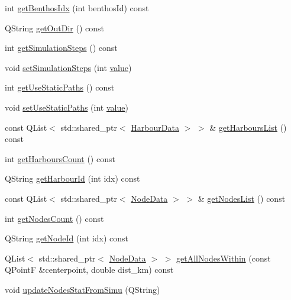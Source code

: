 \begin{DoxyCompactItemize}
\item 
int \mbox{\hyperlink{class_displace_model_a554fafffbd11c2f6a3d6f5bbebbc7d39}{get\+Benthos\+Idx}} (int benthos\+Id) const
\item 
Q\+String \mbox{\hyperlink{class_displace_model_a82e56722ade1c90788c7f2ab629f7ec3}{get\+Out\+Dir}} () const
\item 
int \mbox{\hyperlink{class_displace_model_a84b594669bad027277c2d37d089922b2}{get\+Simulation\+Steps}} () const
\item 
void \mbox{\hyperlink{class_displace_model_a37ba1a54fada6de2335be2c94f98ece3}{set\+Simulation\+Steps}} (int \mbox{\hyperlink{diffusion_8cpp_a4b41795815d9f3d03abfc739e666d5da}{value}})
\item 
int \mbox{\hyperlink{class_displace_model_ab04195fc2d35729735bf0c7c4572ca57}{get\+Use\+Static\+Paths}} () const
\item 
void \mbox{\hyperlink{class_displace_model_a8c78f9404663cba939cfc05364791ea0}{set\+Use\+Static\+Paths}} (int \mbox{\hyperlink{diffusion_8cpp_a4b41795815d9f3d03abfc739e666d5da}{value}})
\item 
const Q\+List$<$ std\+::shared\+\_\+ptr$<$ \mbox{\hyperlink{class_harbour_data}{Harbour\+Data}} $>$ $>$ \& \mbox{\hyperlink{class_displace_model_ad0a9725be1bbe2e5b61c6158ab1325e1}{get\+Harbours\+List}} () const
\item 
int \mbox{\hyperlink{class_displace_model_a07a169ba890a571c48281bb715eb5d4e}{get\+Harbours\+Count}} () const
\item 
Q\+String \mbox{\hyperlink{class_displace_model_ab62df57f3578b592e785de4f2379f620}{get\+Harbour\+Id}} (int idx) const
\item 
const Q\+List$<$ std\+::shared\+\_\+ptr$<$ \mbox{\hyperlink{class_node_data}{Node\+Data}} $>$ $>$ \& \mbox{\hyperlink{class_displace_model_a76d0c1079e730ea8d5284ee58f3eb867}{get\+Nodes\+List}} () const
\item 
int \mbox{\hyperlink{class_displace_model_a45b44fe5ab1354ad05ec3909130c570b}{get\+Nodes\+Count}} () const
\item 
Q\+String \mbox{\hyperlink{class_displace_model_ab62e17f9f7a6d9f39bf08f90fe46b8ef}{get\+Node\+Id}} (int idx) const
\item 
Q\+List$<$ std\+::shared\+\_\+ptr$<$ \mbox{\hyperlink{class_node_data}{Node\+Data}} $>$ $>$ \mbox{\hyperlink{class_displace_model_aef5796a9a7cafe8dea2fc6fb634d2dbe}{get\+All\+Nodes\+Within}} (const Q\+PointF \&centerpoint, double dist\+\_\+km) const
\item 
void \mbox{\hyperlink{class_displace_model_ad464474e425c9ad36a83bcf36dd76657}{update\+Nodes\+Stat\+From\+Simu}} (Q\+String)

\end{DoxyCompactItemize}
